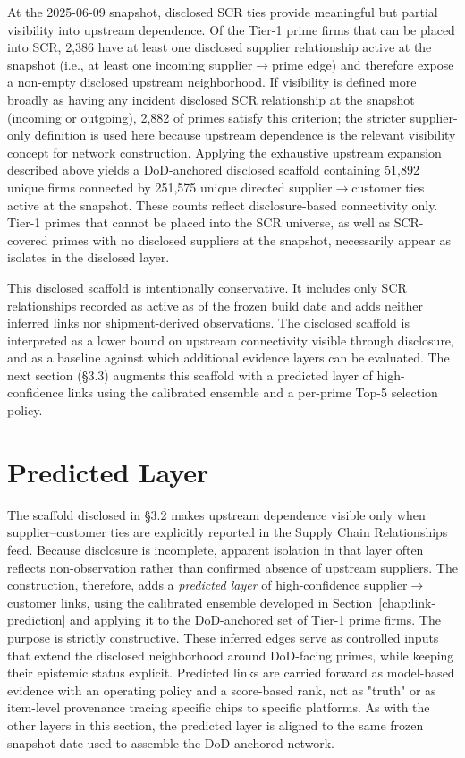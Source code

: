 At the \mbox{2025-06-09} snapshot, disclosed SCR ties provide meaningful but partial visibility into upstream dependence. Of the \NumPrimes Tier-1 prime firms that can be placed into SCR, 2{,}386 have at least one disclosed supplier relationship active at the snapshot (i.e., at least one incoming supplier$\rightarrow$prime edge) and therefore expose a non-empty disclosed upstream neighborhood. If visibility is defined more broadly as having any incident disclosed SCR relationship at the snapshot (incoming or outgoing), 2{,}882 of \NumPrimes primes satisfy this criterion; the stricter supplier-only definition is used here because upstream dependence is the relevant visibility concept for network construction. Applying the exhaustive upstream expansion described above yields a DoD-anchored disclosed scaffold containing 51{,}892 unique firms connected by 251{,}575 unique directed supplier$\rightarrow$customer ties active at the snapshot. These counts reflect disclosure-based connectivity only. Tier-1 primes that cannot be placed into the SCR universe, as well as SCR-covered primes with no disclosed suppliers at the snapshot, necessarily appear as isolates in the disclosed layer.

This disclosed scaffold is intentionally conservative. It includes only SCR relationships recorded as active as of the frozen build date and adds neither inferred links nor shipment-derived observations. The disclosed scaffold is interpreted as a lower bound on upstream connectivity visible through disclosure, and as a baseline against which additional evidence layers can be evaluated. The next section (\S3.3) augments this scaffold with a predicted layer of high-confidence links using the calibrated ensemble and a per-prime Top-5 selection policy.

\section{Predicted Layer}

The scaffold disclosed in \S3.2 makes upstream dependence visible only when supplier--customer ties are explicitly reported in the Supply Chain Relationships feed. Because disclosure is incomplete, apparent isolation in that layer often reflects non-observation rather than confirmed absence of upstream suppliers. The construction, therefore, adds a \emph{predicted layer} of high-confidence supplier$\rightarrow$customer links, using the calibrated ensemble developed in Section~\ref{chap:link-prediction} and applying it to the DoD-anchored set of Tier-1 prime firms. The purpose is strictly constructive. These inferred edges serve as controlled inputs that extend the disclosed neighborhood around DoD-facing primes, while keeping their epistemic status explicit. Predicted links are carried forward as model-based evidence with an operating policy and a score-based rank, not as "truth" or as item-level provenance tracing specific chips to specific platforms. As with the other layers in this section, the predicted layer is aligned to the same frozen snapshot date used to assemble the DoD-anchored network.

